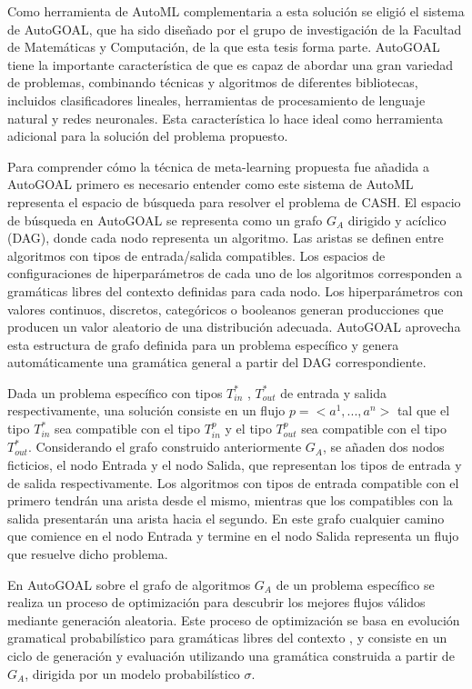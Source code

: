 Como herramienta de AutoML complementaria a esta solución se eligió el sistema de AutoGOAL, que ha sido diseñado por el grupo de investigación de la Facultad de Matemáticas y Computación, de la que esta tesis forma parte. AutoGOAL tiene la importante característica de que es capaz de abordar una gran variedad de problemas, combinando técnicas y algoritmos de diferentes bibliotecas, incluidos clasificadores lineales, herramientas de procesamiento de lenguaje natural y redes neuronales. Esta característica lo hace ideal como herramienta adicional para la solución del problema propuesto.

Para comprender cómo la técnica de meta-learning propuesta fue añadida a AutoGOAL primero es necesario entender como este sistema de AutoML representa el espacio de búsqueda para resolver el problema de CASH. El espacio de búsqueda en AutoGOAL se representa como un grafo $G_A$ dirigido y acíclico (DAG), donde cada nodo representa un algoritmo. Las aristas se definen entre algoritmos con tipos de entrada/salida compatibles. Los espacios de configuraciones de hiperparámetros de cada uno de los algoritmos corresponden a gramáticas libres del contexto definidas para cada nodo. Los hiperparámetros con valores continuos, discretos, categóricos o booleanos generan producciones que producen un valor aleatorio de una distribución adecuada. AutoGOAL aprovecha esta estructura de grafo definida para un problema específico y genera automáticamente una gramática general a partir del DAG correspondiente.

Dada un problema específico con tipos $T^*_{in}$ , $T^*_{out}$ de entrada y salida respectivamente, una solución consiste en un flujo $p =<a^1, ..., a^n >$ tal que el tipo $T^*_{in}$ sea compatible con el tipo $T^p_{in}$ y el tipo $T^p_{out}$ sea compatible con el tipo $T^*_{out}$. Considerando el grafo construido anteriormente $G_A$, se añaden dos nodos ficticios, el nodo Entrada y el nodo Salida, que representan los tipos de entrada y de salida respectivamente. Los algoritmos con tipos de entrada compatible con el primero tendrán una arista desde el mismo, mientras que los compatibles con la salida presentarán una arista hacia el segundo. En este grafo cualquier camino que comience en el nodo Entrada y termine en el nodo Salida representa un flujo que resuelve dicho problema.

En AutoGOAL sobre el grafo de algoritmos $G_A$ de un problema específico se realiza un proceso de optimización para descubrir los mejores flujos válidos mediante generación aleatoria. Este proceso de optimización se basa en evolución gramatical probabilístico para gramáticas libres del contexto \cite{pge2015}, y consiste en un ciclo de generación y evaluación utilizando una gramática construida a partir de $G_A$, dirigida por un modelo probabilístico $\sigma$.


